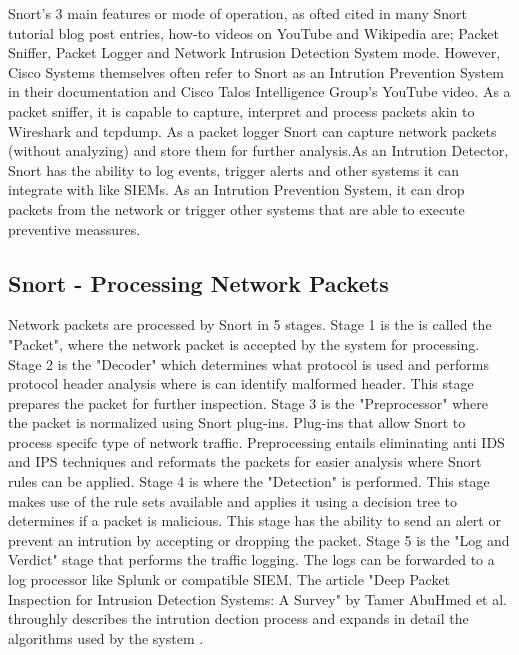 Snort's 3 main features or mode of operation, as ofted cited in many Snort tutorial blog post entries, how-to videos on YouTube and Wikipedia are; Packet Sniffer, Packet Logger and Network Intrusion Detection System mode\cite{Wikipedia2022_Snort}. However, Cisco Systems themselves often refer to Snort as an Intrution Prevention System in their documentation\cite{Ciscco_Snort3_Configuration_Guide_v7} and Cisco Talos Intelligence Group's YouTube video\cite{TIG2020_Snort_101}. As a packet sniffer, it is capable to capture, interpret and process packets akin to Wireshark and tcpdump. As a packet logger Snort can capture network packets (without analyzing) and store them for further analysis.As an Intrution Detector, Snort has the ability to log events, trigger alerts and other systems it can integrate with like SIEMs. As an Intrution Prevention System, it can drop packets from the network or trigger other systems that are able to execute preventive meassures.

\subsection{Snort - Processing Network Packets}

Network packets are processed by Snort in 5 stages. Stage 1 is the is called the "Packet", where the network packet is accepted by the system for processing. Stage 2 is the "Decoder" which determines what protocol is used and performs protocol header analysis where is can identify malformed header. This stage prepares the packet for further inspection. Stage 3 is the "Preprocessor" where the packet is normalized using Snort plug-ins. Plug-ins that allow Snort to process specifc type of network traffic. Preprocessing entails eliminating anti IDS and IPS techniques and reformats the packets for easier analysis where Snort rules can be applied. Stage 4 is where the "Detection" is performed. This stage makes use of the rule sets available and applies it using a decision tree to determines if a packet is malicious. This stage has the ability to send an alert or prevent an intrution by accepting or dropping the packet. Stage 5 is the "Log and Verdict" stage that performs the traffic logging. The logs can be forwarded to a log processor like Splunk or compatible SIEM. The article "Deep Packet Inspection for Intrusion Detection Systems: A Survey" by Tamer AbuHmed et al. throughly describes the intrution dection process and expands in detail the algorithms used by the system \cite{Tamer_et_al2008_Deep_Packet_Inspections}.



